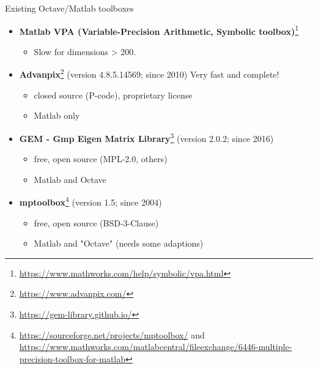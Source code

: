 \begin{frame}{Existing Octave/Matlab toolboxes}

\begin{itemize}\itemsep0.5em

\item
\textbf{Matlab VPA (Variable-Precision Arithmetic,
Symbolic toolbox)}\footnote{\tiny
\url{https://www.mathworks.com/help/symbolic/vpa.html}}
\begin{itemize}
\item
Slow for dimensions > 200.
\end{itemize}

\item
\textbf{Advanpix}\footnote{\tiny
\url{https://www.advanpix.com/}}
(version 4.8.5.14569; since 2010)
{\color{red} Very fast and complete!}
\begin{itemize}
\item
{\color{blue} closed source} (P-code), proprietary license

\item
Matlab only
\end{itemize}

\item
\textbf{GEM - Gmp Eigen Matrix Library}\footnote{\tiny
\url{https://gem-library.github.io/}}
(version 2.0.2; since 2016)
\begin{itemize}
\item
free, open source (MPL-2.0, others)

\item
Matlab and Octave
\end{itemize}

\item
\textbf{mptoolbox}\footnote{\tiny
\url{https://sourceforge.net/projects/mptoolbox/}
and
\url{https://www.mathworks.com/matlabcentral/fileexchange/6446-multiple-precision-toolbox-for-matlab}}
(version 1.5; since 2004)
\begin{itemize}
\item
free, open source (BSD-3-Clause)

\item
Matlab and "Octave" (needs some adaptions)
\end{itemize}

\end{itemize}

\end{frame}

